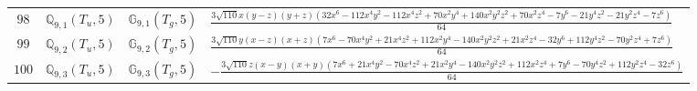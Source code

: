 \documentclass[fleqn,8pt,landscape]{jsarticle}
\begin{document}
\begin{table}[ht!]
\begin{center}
\begin{tabular}{cccl}
$ 98 $ & $ \mathbb{Q}_{9,1}(T_{u},5) $ & $ \mathbb{G}_{9,1}(T_{g},5) $ & $ \frac{3 \sqrt{110} x \left(y - z\right) \left(y + z\right) \left(32 x^{6} - 112 x^{4} y^{2} - 112 x^{4} z^{2} + 70 x^{2} y^{4} + 140 x^{2} y^{2} z^{2} + 70 x^{2} z^{4} - 7 y^{6} - 21 y^{4} z^{2} - 21 y^{2} z^{4} - 7 z^{6}\right)}{64} $ \\
$ 99 $ & $ \mathbb{Q}_{9,2}(T_{u},5) $ & $ \mathbb{G}_{9,2}(T_{g},5) $ & $ \frac{3 \sqrt{110} y \left(x - z\right) \left(x + z\right) \left(7 x^{6} - 70 x^{4} y^{2} + 21 x^{4} z^{2} + 112 x^{2} y^{4} - 140 x^{2} y^{2} z^{2} + 21 x^{2} z^{4} - 32 y^{6} + 112 y^{4} z^{2} - 70 y^{2} z^{4} + 7 z^{6}\right)}{64} $ \\
$ 100 $ & $ \mathbb{Q}_{9,3}(T_{u},5) $ & $ \mathbb{G}_{9,3}(T_{g},5) $ & $ - \frac{3 \sqrt{110} z \left(x - y\right) \left(x + y\right) \left(7 x^{6} + 21 x^{4} y^{2} - 70 x^{4} z^{2} + 21 x^{2} y^{4} - 140 x^{2} y^{2} z^{2} + 112 x^{2} z^{4} + 7 y^{6} - 70 y^{4} z^{2} + 112 y^{2} z^{4} - 32 z^{6}\right)}{64} $ \\
 \hline \hline
\end{tabular}
\end{center}
\end{table}
\end{document}
